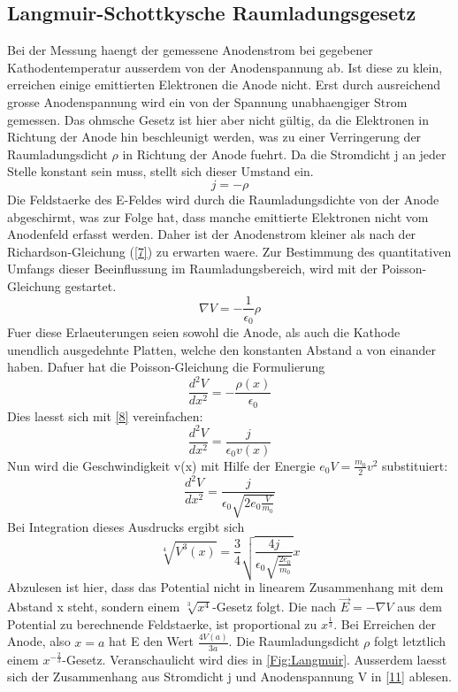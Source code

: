 \subsection{Langmuir-Schottkysche Raumladungsgesetz}
Bei der Messung haengt der gemessene Anodenstrom bei gegebener Kathodentemperatur ausserdem von der Anodenspannung ab. Ist diese zu klein, erreichen einige emittierten Elektronen die Anode nicht. Erst durch ausreichend grosse Anodenspannung wird ein von der Spannung unabhaengiger Strom gemessen. Das ohmsche Gesetz ist hier aber nicht gültig, da die Elektronen in Richtung der Anode hin beschleunigt werden, was zu einer Verringerung der Raumladungsdicht $\rho$ in Richtung der Anode fuehrt. Da die Stromdicht j an jeder Stelle konstant sein muss, stellt sich dieser Umstand ein.
\begin{equation}
    j=-\rho \label{8}
\end{equation}
Die Feldstaerke des E-Feldes wird durch die Raumladungsdichte von der Anode abgeschirmt, was zur Folge hat, dass manche emittierte Elektronen nicht vom Anodenfeld erfasst werden. Daher ist der Anodenstrom kleiner als nach der Richardson-Gleichung (\ref{7}) zu erwarten waere. Zur Bestimmung des quantitativen Umfangs dieser Beeinflussung im Raumladungsbereich, wird mit der Poisson-Gleichung gestartet.
\begin{equation}
    \nabla V=-\frac{1}{\epsilon_0}\rho \nonumber
\end{equation}
Fuer diese Erlaeuterungen seien sowohl die Anode, als auch die Kathode unendlich ausgedehnte Platten, welche den konstanten Abstand a von einander haben. Dafuer hat die Poisson-Gleichung die Formulierung 
\begin{equation}
    \frac{d^2V}{dx^2}=-\frac{\rho(x)}{\epsilon_0}
\end{equation}
Dies laesst sich mit \ref{8} vereinfachen:
\begin{equation}
    \frac{d^2V}{dx^2}=\frac{j}{\epsilon_0v(x)}
\end{equation}
Nun wird die Geschwindigkeit v(x) mit Hilfe der Energie $e_0V=\frac{m_0}{2}v^2$ substituiert:
\begin{equation}
    \frac{d^2V}{dx^2}=\frac{j}{\epsilon_0\sqrt{2e_0\frac{V}{m_0}}}
\end{equation}
Bei Integration dieses Ausdrucks ergibt sich 
\begin{equation}
    \sqrt[4]{V^3(x)}=\frac{3}{4}\sqrt{\frac{4j}{\epsilon_0\sqrt{\frac{2e_0}{m_0}}}}x \label{11}
\end{equation}
Abzulesen ist hier, dass das Potential nicht in linearem Zusammenhang mit dem Abstand x steht, sondern einem $\sqrt[3]{x^4}$-Gesetz folgt. Die nach $\vec{E}=-\nabla V$ aus dem Potential zu berechnende Feldstaerke, ist proportional zu $x^{\frac{1}{3}}$. Bei Erreichen der Anode, also $x=a$ hat E den Wert $\frac{4V(a)}{3a}$. Die Raumladungsdicht $\rho$ folgt letztlich einem $x^{-\frac{2}{3}}$-Gesetz. Veranschaulicht wird dies in \ref{Fig:Langmuir}. Ausserdem laesst sich der Zusammenhang aus Stromdicht j und Anodenspannung V in \ref{11} ablesen.
